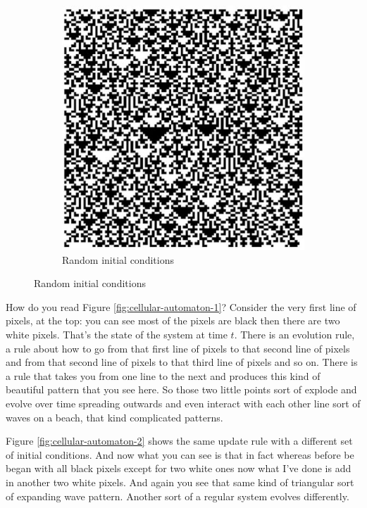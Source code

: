 \documentclass[]{article}
\begin{document}
\begin{figure}[H]
\begin{center}
\begin{subfigure}[T]{0.3\textwidth}
		\end{subfigure}
		\hfill
		\begin{subfigure}[T]{0.3\textwidth}
			\caption{Random initial conditions}\label{fig:cellular-automaton-3}
			\includegraphics[width=\textwidth]{cellular-automaton-3}
		\end{subfigure}
	\end{center}
\end{figure}

How do you read Figure \ref{fig:cellular-automaton-1}?
Consider the very first line of pixels, at the top: you can see most of the pixels are black then there are two white pixels.
That's the state of the system at time $t$.
There is an evolution rule, a rule about how to go from that first line of pixels to that second line of pixels and from that second line of pixels to that third line of pixels and so on.
There is a rule that takes you from one line to the next and produces this kind of beautiful pattern that you see here.
So those two little points sort of explode and evolve over time spreading outwards and even interact with each other line sort of waves on a beach, that kind complicated patterns.

Figure \ref{fig:cellular-automaton-2} shows the same update rule with a different set of initial conditions. And now what you can see is that in fact whereas before be began with all black pixels except for two white ones now what I've done is add in another two white pixels. And again you see that same kind of triangular sort of expanding wave pattern. Another sort of a regular system evolves differently.
\end{document}
